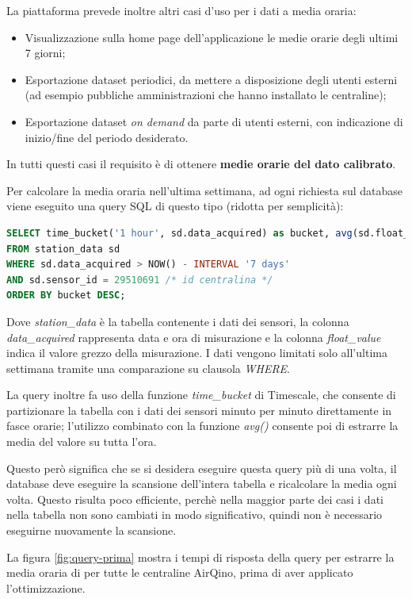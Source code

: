 La piattaforma prevede inoltre altri casi d’uso per i dati a media oraria:
\begin{itemize}
  \item Visualizzazione sulla home page dell’applicazione le medie orarie degli ultimi 7 giorni;
  \item Esportazione dataset periodici, da mettere a disposizione degli utenti esterni (ad esempio pubbliche amministrazioni che hanno installato le centraline);
  \item Esportazione dataset \textit{on demand} da parte di utenti esterni, con indicazione di inizio/fine del periodo desiderato.
\end{itemize}
In tutti questi casi il requisito è di ottenere \textbf{medie orarie del dato calibrato}.

Per calcolare la media oraria nell'ultima settimana, ad ogni richiesta sul database viene eseguito una query SQL di questo tipo (ridotta per semplicità):

\vspace{1mm}
\begin{lstlisting}[language=sql]
SELECT time_bucket('1 hour', sd.data_acquired) as bucket, avg(sd.float_value)
FROM station_data sd
WHERE sd.data_acquired > NOW() - INTERVAL '7 days'
AND sd.sensor_id = 29510691 /* id centralina */
ORDER BY bucket DESC;
\end{lstlisting}

Dove \textit{station\_data} è la tabella contenente i dati dei sensori, la colonna \textit{data\_acquired} rappresenta data e ora di misurazione e la colonna \textit{float\_value} indica il valore grezzo della misurazione.
I dati vengono limitati solo all'ultima settimana tramite una comparazione su clausola \textit{WHERE}.

La query inoltre fa uso della funzione \textit{time\_bucket} di Timescale, che consente di partizionare la tabella con i dati dei sensori minuto per minuto direttamente in fasce orarie; l'utilizzo combinato con la funzione \textit{avg()} consente poi di estrarre la media del valore su tutta l'ora.

Questo però significa che se si desidera eseguire questa query più di una volta, il database deve eseguire la scansione dell'intera tabella e ricalcolare la media ogni volta. Questo risulta poco efficiente, perchè nella maggior parte dei casi i dati nella tabella non sono cambiati in modo significativo, quindi non è necessario eseguirne nuovamente la scansione.

La figura \ref{fig:query-prima} mostra i tempi di risposta della query per estrarre la media oraria di  per tutte le centraline AirQino, prima di aver applicato l'ottimizzazione.

